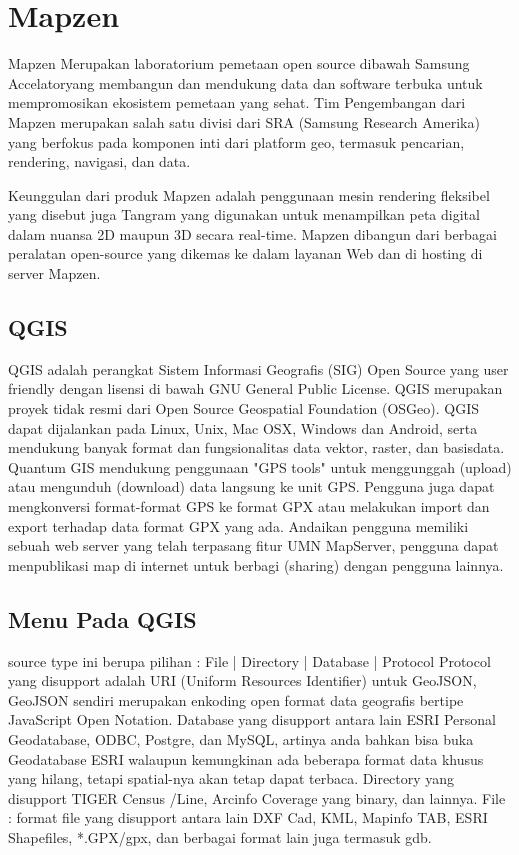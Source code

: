 \section{Mapzen}
Mapzen Merupakan laboratorium pemetaan open source dibawah Samsung Accelatoryang membangun dan mendukung data dan software terbuka untuk mempromosikan ekosistem pemetaan yang sehat. Tim Pengembangan dari Mapzen merupakan salah satu divisi dari SRA (Samsung Research Amerika) yang berfokus pada komponen inti dari platform geo, termasuk pencarian, rendering, navigasi, dan data.

Keunggulan dari produk Mapzen adalah penggunaan mesin rendering fleksibel yang disebut juga Tangram yang digunakan untuk menampilkan peta digital dalam nuansa 2D maupun 3D secara real-time. Mapzen dibangun dari berbagai peralatan open-source yang dikemas ke dalam layanan Web dan di hosting di server Mapzen.

\subsection{QGIS}
QGIS adalah perangkat Sistem Informasi Geografis (SIG) Open Source yang user friendly dengan lisensi di bawah GNU General Public License. QGIS merupakan proyek tidak resmi dari Open Source Geospatial Foundation (OSGeo). QGIS dapat dijalankan pada Linux, Unix, Mac OSX, Windows dan Android, serta mendukung banyak format dan fungsionalitas data vektor, raster, dan basisdata.
Quantum GIS mendukung penggunaan "GPS tools" untuk menggunggah (upload) atau mengunduh (download) data langsung ke unit GPS. Pengguna juga dapat mengkonversi format-format GPS ke format GPX atau melakukan import dan export terhadap data format GPX yang ada.
Andaikan pengguna memiliki sebuah web server yang telah terpasang fitur UMN MapServer, pengguna dapat menpublikasi map di internet untuk berbagi (sharing) dengan pengguna lainnya.


\subsection{Menu Pada QGIS}
source type ini berupa pilihan :
File | Directory | Database | Protocol
Protocol yang disupport adalah URI (Uniform Resources Identifier) untuk GeoJSON, GeoJSON sendiri merupakan enkoding open format data geografis bertipe JavaScript Open Notation.
Database yang disupport antara lain ESRI Personal Geodatabase, ODBC, Postgre, dan MySQL, artinya anda bahkan bisa buka Geodatabase ESRI walaupun kemungkinan ada beberapa format data khusus yang hilang, tetapi spatial-nya akan tetap dapat terbaca.
Directory yang disupport TIGER Census /Line, Arcinfo Coverage yang binary, dan lainnya.
File : format file yang disupport antara lain DXF Cad, KML, Mapinfo TAB, ESRI Shapefiles, *.GPX/gpx, dan berbagai format lain juga termasuk gdb.

